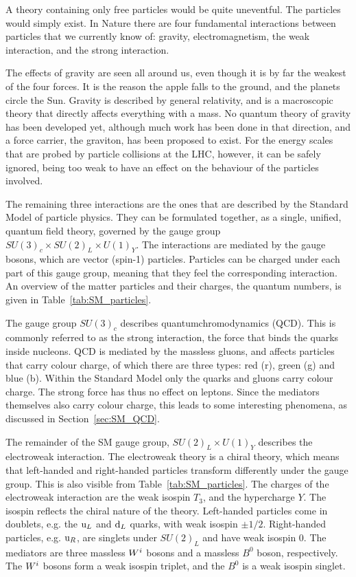 A theory containing only free particles would be quite uneventful. The particles would simply
exist.
In Nature there are four fundamental interactions between particles that we currently know of:
gravity, electromagnetism, the weak interaction, and the strong interaction. 

The effects of gravity are seen all around us, even though it is by far the weakest of the four
forces. It is the reason the apple falls to the ground, and the planets circle the Sun. 
Gravity is described by general relativity, and is a macroscopic theory that directly affects
everything with a mass. No quantum theory of gravity has been developed yet, although much work has
been done in that direction, and a force carrier, the graviton, has been proposed to exist. For the
energy scales that are probed by particle collisions at the LHC, however, it can be safely ignored,
being too weak to have an effect on the behaviour of the particles involved. 

The remaining three interactions are the ones that are described by the Standard Model of
particle physics. They can be formulated together, as a single, unified, quantum field theory,
governed by the gauge group $SU(3)_c \times SU(2)_L \times U(1)_Y$. The interactions are mediated by
the gauge bosons, which are vector (spin-1) particles. Particles can be charged under each part of
this gauge group, meaning that they feel the corresponding interaction. An overview of the matter 
particles and their charges, the quantum numbers, is given in Table~\ref{tab:SM_particles}. 

The gauge group $SU(3)_c$ describes quantumchromodynamics (QCD). This is commonly referred to as the
strong interaction, the force that binds the quarks inside nucleons. QCD is mediated by the
massless gluons, and affects particles that carry colour charge, of which there are three types:
red (r), green (g) and blue (b). Within the Standard Model only the quarks and gluons carry colour
charge. The strong force has thus no effect on leptons. 
Since the mediators themselves also carry colour charge, this leads to some interesting phenomena,
as discussed in Section~\ref{sec:SM_QCD}. 

The remainder of the SM gauge group, $SU(2)_L \times U(1)_Y$ describes the electroweak interaction. 
The electroweak theory is a chiral theory, which means that left-handed and right-handed particles
transform differently under the gauge group. This is also visible from
Table~\ref{tab:SM_particles}.
The charges of the electroweak interaction are the weak isospin $T_3$, and the hypercharge $Y$. 
The isospin reflects the chiral nature of the theory. Left-handed particles come in doublets, e.g.
the $\mathrm{u}_L$ and $\mathrm{d}_L$ quarks, with weak isospin $\pm 1/2$. Right-handed particles, e.g.
$\mathrm{u}_R$, are singlets under $SU(2)_L$ and have weak isospin 0. 
The mediators are three massless $W^i$ bosons and a massless $B^0$ boson, respectively. The $W^i$
bosons form a weak isospin triplet, and the $B^0$ is a weak isospin singlet. 


